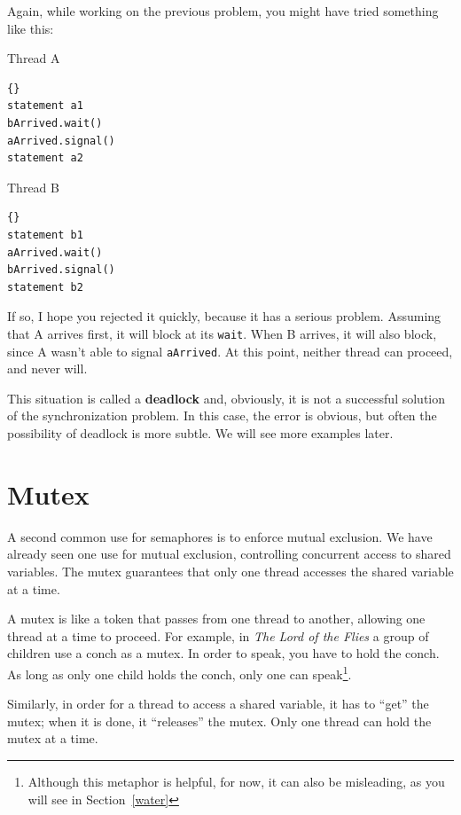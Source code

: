 \documentclass{book}
\begin{document}
Again, while working on the previous problem, you might have
tried something like this:

\begin{minipage}[t]{2in}
Thread A
\begin{lstlisting}{}
statement a1
bArrived.wait()
aArrived.signal()
statement a2
\end{lstlisting}
\end{minipage}
\hfill
\begin{minipage}[t]{2in}
Thread B
\begin{lstlisting}{}
statement b1
aArrived.wait()
bArrived.signal()
statement b2
\end{lstlisting}
\end{minipage}

If so, I hope you rejected it quickly, because it has a serious
problem.  Assuming that A arrives first, it will block at its
{\tt wait}.  When B arrives, it will also block, since A wasn't
able to signal {\tt aArrived}.  At this point, neither thread
can proceed, and never will.

This situation is called a {\bf deadlock} and, obviously, it is
not a successful solution of the synchronization problem.  In
this case, the error is obvious, but often the possibility of
deadlock is more subtle.  We will see more examples later.


\section{Mutex}

A second common use for semaphores is to enforce mutual exclusion.
We have already seen one use for mutual exclusion, controlling
concurrent access to shared variables.  The mutex guarantees
that only one thread accesses the shared variable at a time.

A mutex is like a token that passes from one thread to another,
allowing one thread at a time to proceed.  For example, in {\em The
Lord of the Flies} a group of children use a conch as a mutex.  In
order to speak, you have to hold the conch.  As long as only one child
holds the conch, only one can speak\footnote{Although this metaphor
is helpful, for now, it can also be misleading, as you will see in
Section~\ref{water}}.

Similarly, in order for a thread to access a shared variable,
it has to ``get'' the mutex; when it is done, it ``releases''
the mutex.  Only one thread can hold the mutex at a time.
\end{document}
